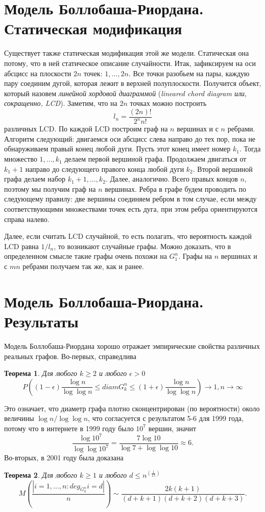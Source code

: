 \documentclass[14pt]{extreport}
\begin{document}
\section{Модель Боллобаша-Риордана. Статическая модификация}
Существует также статическая модификация этой же модели. Статическая она потому, что в ней статическое описание случайности.
Итак, зафиксируем на оси абсцисс на плоскости $2n$ точек: $1, \dots, 2n$. Все точки разобьем на пары, каждую пару соединим дугой, которая лежит в верхней полуплоскости. Получится объект, который назовем {\it линейной хордовой диаграммой} ({\it lineared chord diagram или, сокращенно, LCD}). Заметим, что на $2n$ точках можно построить
$$
l_n = \frac{(2n)!}{2^nn!}
$$
различных LCD. По каждой LCD построим граф на $n$ вершинах и с $n$ ребрами. Алгоритм следующий: двигаемся оси абсцисс слева направо до тех пор, пока не обнаруживаем правый конец любой дуги. Пусть этот конец имеет номер $k_1$. Тогда множество ${1, \dots, k_1}$ делаем первой вершиной графа. Продолжаем двигаться от $k_1 + 1$ направо до следующего правого конца любой дуги $k_2$. Второй вершиной графа делаем набор ${k_1 + 1, \dots, k_2}$. Далее, аналогично. Всего правых концов $n$, поэтому мы получим граф на $n$ вершинах. Ребра в графе будем проводить по следующему правилу: две вершины соединяем ребром в том случае, если между соответствующими множествами точек есть дуга, при этом ребра ориентируются справа налево.

Далее, если считать LCD случайной, то есть полагать, что вероятность каждой LCD равна $1/l_n$, то возникают случайные графы. Можно доказать, что в определенном смысле такие графы очень похожи на $G_1^n$. Графы на $n$ вершинах и с $mn$ ребрами получаем так же, как и ранее.

\section{Модель Боллобаша-Риордана. Результаты}

Модель Боллобаша-Риордана хорошо отражает эмпирические свойства различных реальных графов. Во-первых, справедлива
\newtheorem{theorem}{Теорема}
\begin{theorem}
Для любого $k \ge 2$ и любого $\epsilon > 0$
$$
P\left((1-\epsilon)\frac{\log n}{\log \log n} \le diam G_k^n \le (1+\epsilon)\frac{\log n}{\log \log n}\right) \to 1, n \to \infty
$$
\end{theorem}
Это означает, что диаметр графа плотно сконцентрирован (по вероятности) около величины $\log n / \log \log n$, что согласуется с результатом 5-6 для 1999 года, потому что в интернете в 1999 году было $10^7$ вершин, значит
$$
\frac{\log 10^7}{\log \log 10^7} = \frac {7\log 10}{\log 7 + \log\log 10} \approx 6.
$$
Во-вторых, в 2001 году была доказана
\begin{theorem}
Для любого $k \ge 1$ и любого $d \le n^(\frac{1}{15})$
$$
M\left(\frac{|{i=1,\dots,n:deg_{G_k^n}i = d}|}{n}\right) \sim \frac{2k(k+1)}{(d+k+1)(d+k+2)(d+k+3)}.
$$
\end{theorem}
\end{document}
